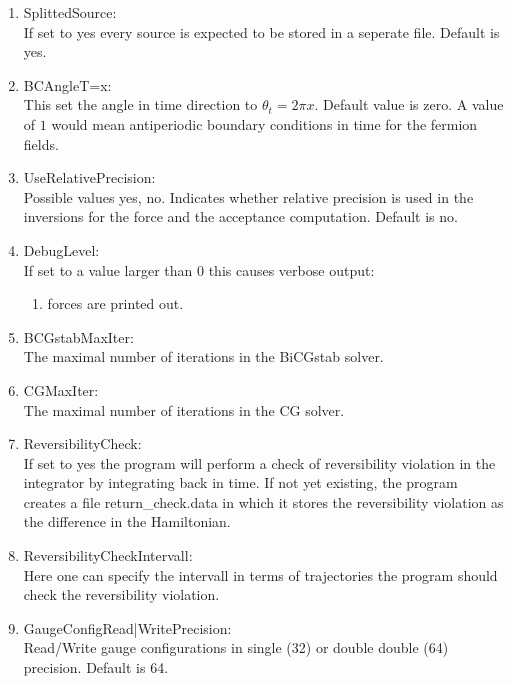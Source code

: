 \begin{enumerate}
\item {\ttfamily SplittedSource}:\\
  If set to yes every source is expected to be stored in a seperate file.
  Default is {\ttfamily yes}.

\item {\ttfamily BCAngleT=x}:\\
  This set the angle in
  time direction to $\theta_t = 2\pi x$. Default value is
  zero. A value of $1$ would mean antiperiodic boundary conditions in
  time for the fermion fields.

\item {\ttfamily UseRelativePrecision}:\\
  Possible values {\ttfamily yes, no}. Indicates whether relative
  precision is used in the inversions for the force and the acceptance
  computation. Default is no.

\item {\ttfamily DebugLevel}:\\
  If set to a value larger than $0$ this causes verbose output:
  \begin{enumerate}
  \item forces are printed out.
  \end{enumerate}

\item {\ttfamily BCGstabMaxIter}:\\
  The maximal number of iterations in the BiCGstab solver.

\item {\ttfamily CGMaxIter}:\\
  The maximal number of iterations in the CG solver.

\item {\ttfamily ReversibilityCheck}:\\
  If set to {\ttfamily yes} the program will perform a check of
  reversibility violation in the integrator by integrating back in
  time. If not yet existing, the program creates a file {\ttfamily
    return\_check.data} in which it stores the reversibility violation
  as the difference in the Hamiltonian.

\item {\ttfamily ReversibilityCheckIntervall}:\\
  Here one can specify the intervall in terms of trajectories the
  program should check the reversibility violation.

\item {\ttfamily GaugeConfigRead|WritePrecision}:\\
  Read/Write gauge configurations in single (32) or double double (64)
  precision. Default is 64.


\end{enumerate}
